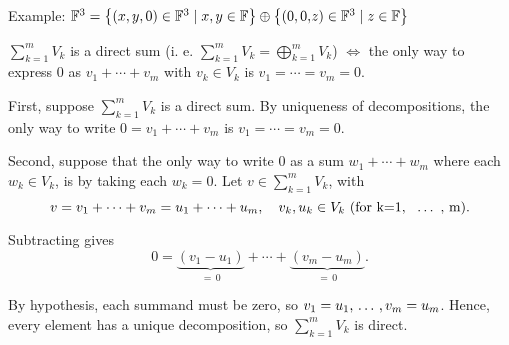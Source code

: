 \begin{example}
  Example: $\mathbb{F}^3 =
  \left \{ \left ( x, y, 0 \right ) \in \mathbb{F}^3 \mid x,y \in \mathbb{F} \right \}
  \oplus
  \left \{ \left (  0, 0, \phantom{y} \!\!\!\! z  \right ) \in \mathbb{F}^3 \mid z \in \mathbb{F} \right \}$
\end{example}


\setcounter{thm}{44}
\begin{thm} 
  \label{thm: condition for a direct sum}
  $\sum_{k=1}^m V_k$ is a direct sum (i. e. $\sum_{k=1}^m V_k = \bigoplus_{k=1}^m V_k$) $\iff$ the only way to express $0$ as $v_1 + \cdots + v_m$ with $v_k \in V_k$ is $v_1 = \cdots = v_m = 0$.
\end{thm}
\begin{prf}
    \Rightarrowdirection
    First, suppose $\sum_{k=1}^m V_k$ is a direct sum.
    By uniqueness of decompositions, the only way to write $0 = v_1 + \cdots + v_m$ is $v_1 = \cdots = v_m = 0$.

    \Leftarrowdirection Second, suppose that the only way to write $0$ as a sum $w_1 + \cdots + w_m$ where each $w_k \in V_k$, is by taking each $w_k = 0$. Let $v \in \sum_{k=1}^m V_k$, with
    \begin{equation}
        v = v_1 + \cdots + v_m = u_1 + \cdots + u_m, \quad v_k, u_k \in V_k \text{ (for k=1, {\, \ldots \,\,}, m)} .
    \end{equation}

    Subtracting gives
    \begin{equation}
      0= \underbrace{(v_1-u_1)}_{= \, 0}+\cdots+\underbrace{(v_m-u_m)}_{= \, 0}.
    \end{equation}

    By hypothesis, each summand must be zero, so $v_1=u_1, {\, \ldots \,\,}, v_m=u_m$.
    Hence, every element has a unique decomposition, so $\sum_{k=1}^m V_k$ is direct.
\end{prf}

